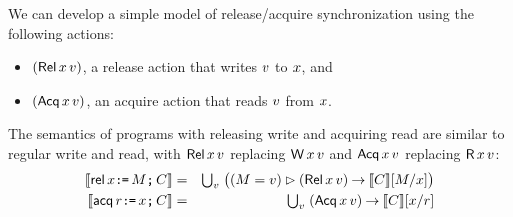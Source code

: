 \documentclass[conference]{IEEEtran}
\theoremstyle{plain}
\theoremstyle{definition}
\begin{document}


We can develop a simple model of release/acquire synchronization using the
following actions: %
\begin{itemize}
\item $(\DWRel{\aLoc}{\aVal})$, a release action that writes $v$ to $x$, and
\item $(\DRAcq{\aLoc}{\aVal})$, an acquire action that reads $v$ from $x$.
\end{itemize}
The semantics of programs with releasing write and acquiring read are similar
to regular write and read, with $\DWRel\aLoc\aVal$ replacing
$\DW\aLoc\aVal$ and $\DRAcq\aLoc\aVal$ replacing $\DR\aLoc\aVal$:
\begin{eqnarray*}
  \sem{\REL\aLoc\GETS\aExp\SEMI \aCmd} & = & \textstyle\bigcup_\aVal\; \bigl((\aExp=\aVal) \guard (\DWRel\aLoc\aVal) \prefix \sem{\aCmd}[\aExp/\aLoc]\bigr) \\
  \sem{\ACQ\aReg\GETS\aLoc\SEMI \aCmd} & = & \textstyle\bigcup_\aVal\; (\DRAcq\aLoc\aVal) \prefix \sem{\aCmd}[\aLoc/\aReg]
\end{eqnarray*}
\end{document}

